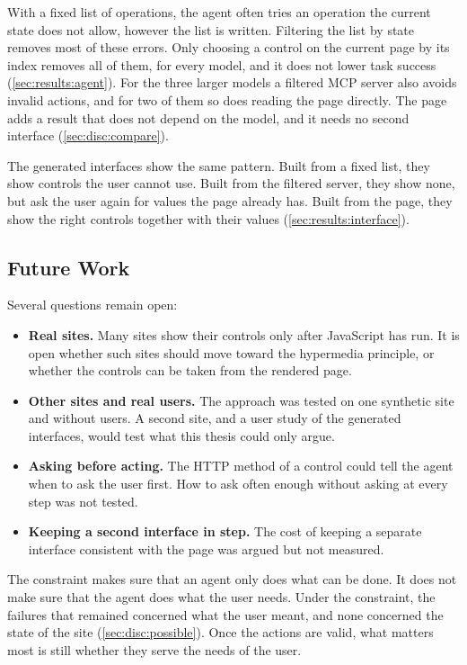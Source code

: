 With a fixed list of operations, the agent often tries an operation the current state does not allow, however the list is written.
Filtering the list by state removes most of these errors.
Only choosing a control on the current page by its index removes all of them, for every model, and it does not lower task success (\autoref{sec:results:agent}).
For the three larger models a filtered MCP server also avoids invalid actions, and for two of them so does reading the page directly.
The page adds a result that does not depend on the model, and it needs no second interface (\autoref{sec:disc:compare}).

The generated interfaces show the same pattern.
Built from a fixed list, they show controls the user cannot use.
Built from the filtered server, they show none, but ask the user again for values the page already has.
Built from the page, they show the right controls together with their values (\autoref{sec:results:interface}).

\subsection{Future Work}

Several questions remain open:
\begin{itemize}
    \item \textbf{Real sites.}
    Many sites show their controls only after JavaScript has run.
    It is open whether such sites should move toward the hypermedia principle, or whether the controls can be taken from the rendered page.
    \item \textbf{Other sites and real users.}
    The approach was tested on one synthetic site and without users.
    A second site, and a user study of the generated interfaces, would test what this thesis could only argue.
    \item \textbf{Asking before acting.}
    The HTTP method of a control could tell the agent when to ask the user first.
    How to ask often enough without asking at every step was not tested.
    \item \textbf{Keeping a second interface in step.}
    The cost of keeping a separate interface consistent with the page was argued but not measured.
\end{itemize}

The constraint makes sure that an agent only does what can be done.
It does not make sure that the agent does what the user needs.
Under the constraint, the failures that remained concerned what the user meant, and none concerned the state of the site (\autoref{sec:disc:possible}).
Once the actions are valid, what matters most is still whether they serve the needs of the user.
